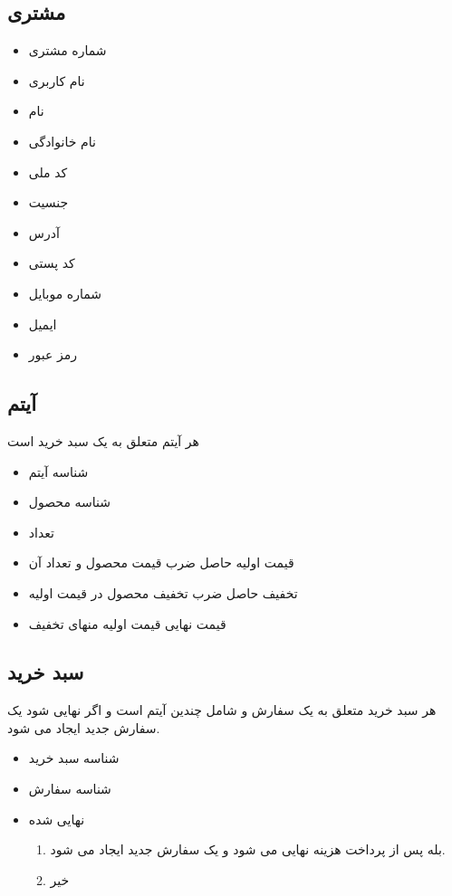 \documentclass[]{article}
\begin{document}
\subsection{مشتری}
\begin{itemize}
\item شماره مشتری
\item نام کاربری
\item نام
\item نام خانوادگی
\item کد ملی
\item جنسیت
\item آدرس
\item کد پستی
\item شماره موبایل
\item ایمیل
\item رمز عبور
\end{itemize}







\subsection{آیتم}
هر آیتم متعلق به یک سبد خرید است

\begin{itemize}
\item شناسه آیتم
\item شناسه محصول
\item تعداد
\item قیمت اولیه \newline
حاصل ضرب قیمت محصول و تعداد آن
\item تخفیف \newline
حاصل ضرب تخفیف محصول در قیمت اولیه
\item قیمت نهایی \newline
قیمت اولیه منهای تخفیف
\end{itemize}








\subsection{سبد خرید}
هر سبد خرید متعلق به یک سفارش و شامل چندین آیتم است و اگر نهایی شود یک سفارش جدید ایجاد می شود.
\begin{itemize}
\item شناسه سبد خرید
\item شناسه سفارش
\item نهایی شده
\begin{enumerate}
\item بله \newline
پس از پرداخت هزینه نهایی می شود و یک سفارش جدید ایجاد می شود.
\item خیر \newline
\end{enumerate}

\end{itemize}
\end{document}
